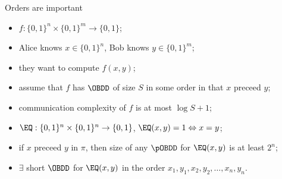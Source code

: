 \begin{frame}{Orders are important}
    \begin{itemize}
        \item $f: \{0, 1\}^n \times \{0, 1\}^m \to \{0, 1\}$;
        \item Alice knows $x \in \{0, 1\}^n$, Bob knows $y \in \{0, 1\}^m$;
        \item they want to compute $f(x, y)$;
        \pause
        \item assume that $f$ has $\OBDD$ of size $S$ in some order in that $x$ preceed $y$;
        \item communication complexity of $f$ is at most $\log S + 1$;
        \pause
        \item $\EQ: \{0, 1\}^n \times \{0, 1\}^n \to \{0, 1\}$, $\EQ(x, y) = 1 \Leftrightarrow x = y$;
        \item if $x$ preceed $y$ in $\pi$, then size of any $\pOBDD$ for $\EQ(x, y)$ is at least $2^n$;
        \pause
        \item $\exists$ short $\OBDD$ for $\EQ(x, y)$ in the order $x_1, y_1, x_2, y_2, \dots, x_n, y_n$.
    \end{itemize}
\end{frame}